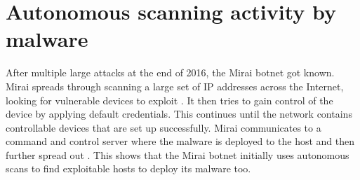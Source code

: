 \section{Autonomous scanning activity by malware}
\label{s:AutonomousScanning}
After multiple large attacks at the end of 2016, the Mirai botnet got known. Mirai spreads through scanning a large set of IP addresses across the Internet, looking for vulnerable devices to exploit \autocite{10.5555/3241189.3241275}. It then tries to gain control of the device by applying default credentials. This continues until the network contains controllable devices that are set up successfully. Mirai communicates to a command and control server where the malware is deployed to the host and then further spread out \autocite{MiraiPracticalAnalysis}.
This shows that the Mirai botnet initially uses autonomous scans to find exploitable hosts to deploy its malware too.
